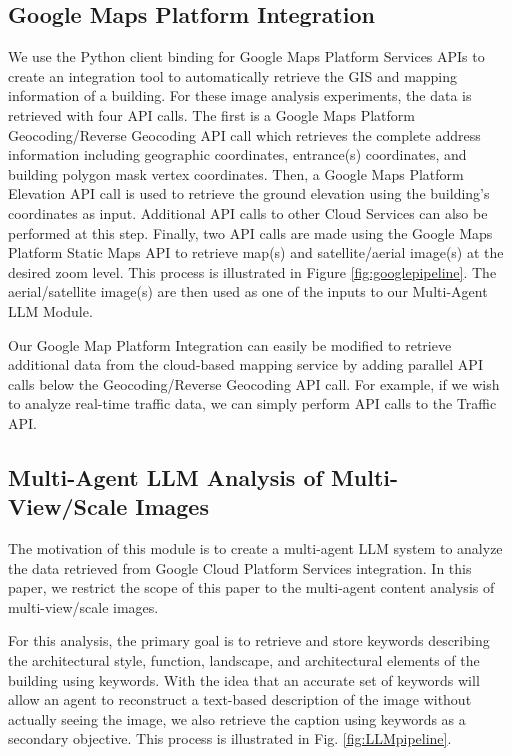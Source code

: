 \subsection{Google Maps Platform Integration}
We use the Python client binding for Google Maps Platform Services APIs to create an integration tool to automatically retrieve the GIS and mapping information of a building. For these image analysis experiments, the data is retrieved with four API calls. The first is a Google Maps Platform Geocoding/Reverse Geocoding API call which retrieves the complete address information including geographic coordinates, entrance(s) coordinates, and building polygon mask vertex coordinates. Then, a Google Maps Platform Elevation API call is used to retrieve the ground elevation using the building's coordinates as input. Additional API calls to other Cloud Services can also be performed at this step. Finally, two API calls are made using the Google Maps Platform Static Maps API to retrieve map(s) and satellite/aerial image(s) at the desired zoom level. This process is illustrated in Figure \ref{fig:googlepipeline}. The aerial/satellite image(s) are then used as one of the inputs to our Multi-Agent LLM Module.

Our Google Map Platform Integration can easily be modified to retrieve additional data from the cloud-based mapping service by adding parallel API calls below the Geocoding/Reverse Geocoding API call. For example, if we wish to analyze real-time traffic data, we can simply perform API calls to the Traffic API.

\subsection{Multi-Agent LLM Analysis of Multi-View/Scale Images}
The motivation of this module is to create a multi-agent LLM system to analyze the data retrieved from Google Cloud Platform Services integration. In this paper, we restrict the scope of this paper to the multi-agent content analysis of multi-view/scale images.

For this analysis, the primary goal is to retrieve and store keywords describing the architectural style, function, landscape, and architectural elements of the building using keywords. With the idea that an accurate set of keywords will allow an agent to reconstruct a text-based description of the image without actually seeing the image, we also retrieve the caption using keywords as a secondary objective. This process is illustrated in Fig. \ref{fig:LLMpipeline}.


